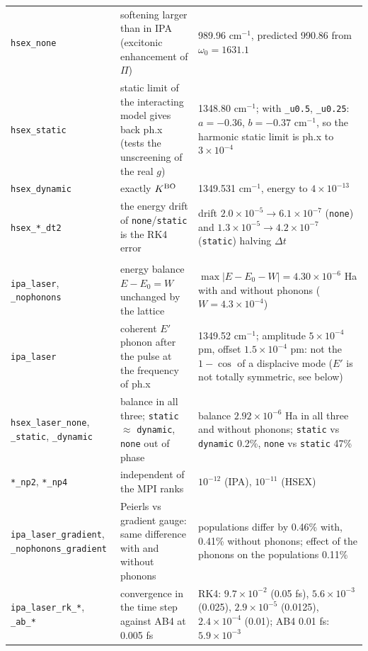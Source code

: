 \documentclass[11pt]{article}
\begin{document}
\begin{center}
\begin{tabularx}{\textwidth}{@{}>{\raggedright\arraybackslash}p{3.3cm}>{\raggedright\arraybackslash}p{5.2cm}L@{}}
\texttt{hsex\_none} & softening larger than in IPA (excitonic enhancement of $\Pi$) & 989.96 cm$^{-1}$, predicted 990.86 from $\omega_0=1631.1$ \\
\texttt{hsex\_static} & static limit of the interacting model gives back ph.x (tests the unscreening of the real $g$) & 1348.80 cm$^{-1}$; with \texttt{\_u0.5}, \texttt{\_u0.25}: $a=-0.36$, $b=-0.37$ cm$^{-1}$, so the harmonic static limit is ph.x to $3\times10^{-4}$ \\
\texttt{hsex\_dynamic} & exactly $K^{\rm BO}$ & 1349.531 cm$^{-1}$, energy to $4\times10^{-13}$ \\
\texttt{hsex\_*\_dt2} & the energy drift of \texttt{none}/\texttt{static} is the RK4 error & drift $2.0\times10^{-5}\to6.1\times10^{-7}$ (\texttt{none}) and $1.3\times10^{-5}\to4.2\times10^{-7}$ (\texttt{static}) halving $\Delta t$ \\
\midrule
{} \\
\texttt{ipa\_laser}, \texttt{\_nophonons} & energy balance $E-E_0=W$ unchanged by the lattice & $\max|E-E_0-W| = 4.30\times10^{-6}$ Ha with and without phonons ($W=4.3\times10^{-4}$) \\
\texttt{ipa\_laser} & coherent $E'$ phonon after the pulse at the frequency of ph.x & 1349.52 cm$^{-1}$; amplitude $5\times10^{-4}$ pm, offset $1.5\times10^{-4}$ pm: not the $1-\cos$ of a displacive mode ($E'$ is not totally symmetric, see below) \\
\texttt{hsex\_laser\_none}, \texttt{\_static}, \texttt{\_dynamic} & balance in all three; \texttt{static} $\approx$ \texttt{dynamic}, \texttt{none} out of phase & balance $2.92\times10^{-6}$ Ha in all three and without phonons; \texttt{static} vs \texttt{dynamic} 0.2\%, \texttt{none} vs \texttt{static} 47\% \\
\texttt{*\_np2}, \texttt{*\_np4} & independent of the MPI ranks & $10^{-12}$ (IPA), $10^{-11}$ (HSEX) \\
\texttt{ipa\_laser\_gradient}, \texttt{\_nophonons\_gradient} & Peierls vs gradient gauge: same difference with and without phonons & populations differ by 0.46\% with, 0.41\% without phonons; effect of the phonons on the populations 0.11\% \\
\texttt{ipa\_laser\_rk\_*}, \texttt{\_ab\_*} & convergence in the time step against AB4 at 0.005 fs & RK4: $9.7\times10^{-2}$ (0.05 fs), $5.6\times10^{-3}$ (0.025), $2.9\times10^{-5}$ (0.0125), $2.4\times10^{-4}$ (0.01); AB4 0.01 fs: $5.9\times10^{-3}$ \\
\bottomrule
\end{tabularx}
\end{center}
\end{document}
